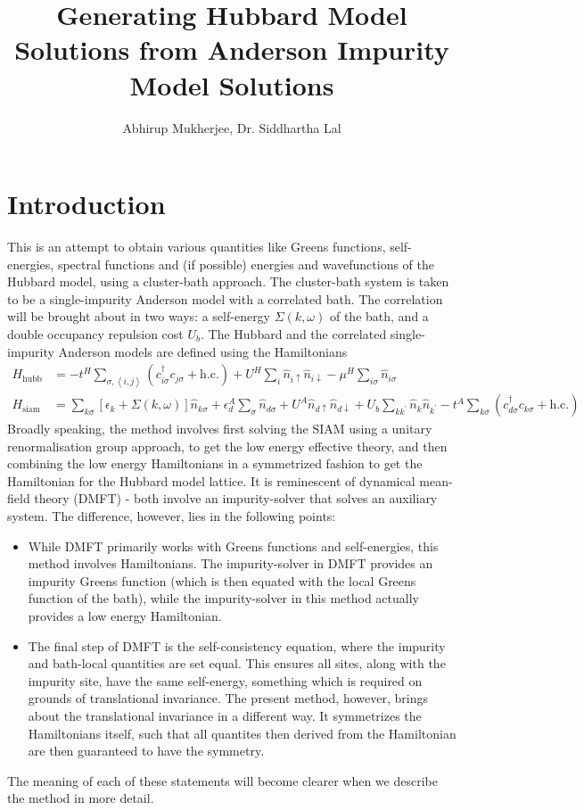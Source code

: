 \documentclass[12pt]{article}
\title{Generating Hubbard Model Solutions from Anderson Impurity Model Solutions}
\author{Abhirup Mukherjee, Dr. Siddhartha Lal}
\numberwithin{equation}{section}
\begin{document}
\maketitle
\section{Introduction}
This is an attempt to obtain various quantities like Greens functions, self-energies, spectral functions and (if possible) energies and wavefunctions of the Hubbard model, using a cluster-bath approach. The cluster-bath system is taken to be a single-impurity Anderson model with a correlated bath. The correlation will be brought about in two ways: a self-energy $\Sigma(k,\omega)$ of the bath, and a double occupancy repulsion cost $U_b$. The Hubbard and the correlated single-impurity Anderson models are defined using the Hamiltonians
\begin{align}
H_\text{hubb} &= -t^H\sum_{\sigma,\left<i,j \right>}\left(c^\dagger_{i\sigma} c_{j\sigma} + \text{h.c.}\right) + U^H\sum_i \hat n_{i \uparrow} \hat n_{i \downarrow} - \mu^H \sum_{i\sigma}\hat n_{i\sigma}\\
H_\text{siam} &= \sum_{k\sigma}\left[\epsilon_k + \Sigma(k,\omega)\right]\hat n_{k\sigma} + \epsilon_d^A \sum_\sigma\hat n_{d\sigma} + U^A \hat n_{d \uparrow} \hat n_{d \downarrow} + U_b \sum_{kk^\prime}\hat n_k \hat n_{k^\prime} -t^A\sum_{k\sigma}\left(c^\dagger_{d\sigma}c_{k\sigma} + \text{h.c.}\right) \label{clus_bath_siam}
\end{align}
Broadly speaking, the method involves first solving the SIAM using a unitary renormalisation group approach, to get the low energy effective theory, and then combining the low energy Hamiltonians in a symmetrized fashion to get the Hamiltonian for the Hubbard model lattice. It is reminescent of dynamical mean-field theory (DMFT) - both involve an impurity-solver that solves an auxiliary system. The difference, however, lies in the following points:
\begin{itemize}
	\item While DMFT primarily works with Greens functions and self-energies, this method involves Hamiltonians. The impurity-solver in DMFT provides an impurity Greens function (which is then equated with the local Greens function of the bath), while the impurity-solver in this method actually provides a low energy Hamiltonian.
	\item The final step of DMFT is the self-consistency equation, where the impurity and bath-local quantities are set equal. This ensures all sites, along with the impurity site, have the same self-energy, something which is required on grounds of  translational invariance. The present method, however, brings about the translational invariance in a different way. It symmetrizes the Hamiltonians itself, such that all quantites then derived from the Hamiltonian are then guaranteed to have the symmetry.
\end{itemize}
The meaning of each of these statements will become clearer when we describe the method in more detail.
\end{document}
